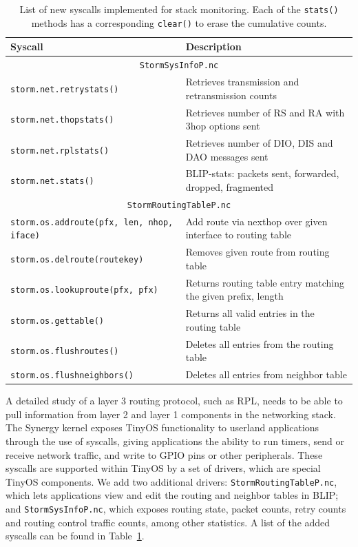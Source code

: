 \begin{table}[ht]
\centering
\begin{tabular}{| l | l |}
\hline
\textbf{Syscall} & \textbf{Description} \\ \hline \hline
\multicolumn{2}{|c|}{\texttt{StormSysInfoP.nc}} \\ \hline
\verb`storm.net.retrystats()` & Retrieves transmission and retransmission counts \\ \hline
\verb`storm.net.thopstats()` & Retrieves number of RS and RA with 3hop options sent \\ \hline
\verb`storm.net.rplstats()` & Retrieves number of DIO, DIS and DAO messages sent \\ \hline
\verb`storm.net.stats()` & BLIP-stats: packets sent, forwarded, dropped, fragmented \\ \hline
\multicolumn{2}{|c|}{\texttt{StormRoutingTableP.nc}} \\ \hline
\verb`storm.os.addroute(pfx, len, nhop, iface)` & Add route via nexthop over given interface to routing table \\ \hline
\verb`storm.os.delroute(routekey)` & Removes given route from routing table \\ \hline
\verb`storm.os.lookuproute(pfx, pfx)` & Returns routing table entry matching the given prefix, length \\ \hline
\verb`storm.os.gettable()` & Returns all valid entries in the routing table \\ \hline
\verb`storm.os.flushroutes()` & Deletes all entries from the routing table \\ \hline
\verb`storm.os.flushneighbors()` & Deletes all entries from neighbor table \\ \hline

\end{tabular}
\caption{List of new syscalls implemented for stack monitoring. Each of the \texttt{stats()} methods has a corresponding \texttt{clear()} to erase the cumulative counts.}
\label{table:syscalls}
\end{table}

A detailed study of a layer 3 routing protocol, such as RPL, needs to be able to pull information from layer 2 and layer 1 components in the networking stack.
The Synergy kernel exposes TinyOS functionality to userland applications through the use of syscalls, giving applications the ability to run timers, send or receive network traffic, and write to GPIO pins or other peripherals.
These syscalls are supported within TinyOS by a set of drivers, which are special TinyOS components.
We add two additional drivers: \texttt{StormRoutingTableP.nc}, which lets applications view and edit the routing and neighbor tables in BLIP; and \texttt{StormSysInfoP.nc}, which exposes routing state, packet counts, retry counts and routing control traffic counts, among other statistics.
A list of the added syscalls can be found in Table~\ref{table:syscalls}.

